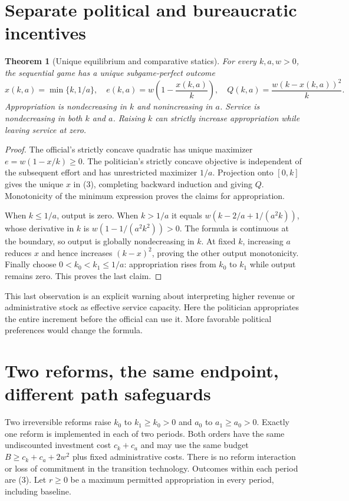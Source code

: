 \documentclass[11pt]{article}
\newtheorem{theorem}{Theorem}
\begin{document}
\section{Separate political and bureaucratic incentives}
\begin{theorem}[Unique equilibrium and comparative statics]\label{game}
For every $k,a,w>0$, the sequential game has a unique subgame-perfect
outcome
\[
 x(k,a)=\min\{k,1/a\},\quad
 e(k,a)=w\left(1-\frac{x(k,a)}k\right),\quad
 Q(k,a)=\frac{w(k-x(k,a))^2}{k}.                              \tag{3}
\]
Appropriation is nondecreasing in $k$ and nonincreasing in $a$.
Service is nondecreasing in both $k$ and $a$. Raising $k$ can strictly
increase appropriation while leaving service at zero.
\end{theorem}
\begin{proof}
The official's strictly concave quadratic has unique maximizer
$e=w(1-x/k)\geq0$. The politician's strictly concave objective is
independent of the subsequent effort and has unrestricted maximizer
$1/a$. Projection onto $[0,k]$ gives the unique $x$ in (3), completing
backward induction and giving $Q$. Monotonicity of the minimum expression
proves the claims for appropriation.

When $k\leq1/a$, output is zero. When $k>1/a$ it equals
$w(k-2/a+1/(a^2k))$, whose derivative in $k$ is
$w(1-1/(a^2k^2))>0$. The formula is continuous at the boundary, so
output is globally nondecreasing in $k$. At fixed $k$, increasing $a$
reduces $x$ and hence increases $(k-x)^2$, proving the other output
monotonicity. Finally choose $0<k_0<k_1\leq1/a$: appropriation rises
from $k_0$ to $k_1$ while output remains zero. This proves the last claim.
\end{proof}
This last observation is an explicit warning about interpreting higher
revenue or administrative stock as effective service capacity. Here the
politician appropriates the entire increment before the official can use
it. More favorable political preferences would change the formula.

\section{Two reforms, the same endpoint, different path safeguards}
Two irreversible reforms raise $k_0$ to $k_1\geq k_0>0$ and $a_0$ to
$a_1\geq a_0>0$. Exactly one reform is implemented in each of two periods.
Both orders have the same undiscounted investment cost $c_k+c_a$ and may
use the same budget $B\geq c_k+c_a+2w^2$ plus fixed administrative costs.
There is no reform interaction or loss of commitment in the transition
technology. Outcomes within each period are (3). Let $r\geq0$ be a
maximum permitted appropriation in every period, including baseline.
\end{document}
